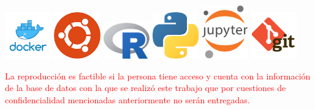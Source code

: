 \includegraphics[width=2cm]{imagenes/logos/docker.jpeg}
\includegraphics[width=2cm]{imagenes/logos/ubuntu_logo_2.png}
\includegraphics[width=2cm]{imagenes/logos/Rlogo.png}
\includegraphics[width=2cm]{imagenes/logos/python.jpeg}
\includegraphics[width=2cm]{imagenes/logos/jupyter.png}
\includegraphics[width=2cm]{imagenes/logos/git_logo_2.png}

\vspace{5mm}

\textcolor{red}{
La reproducción es factible si la persona tiene acceso y cuenta con la información de la base de datos con la que se realizó este trabajo que por cuestiones de confidencialidad mencionadas anteriormente no serán entregadas.
}


